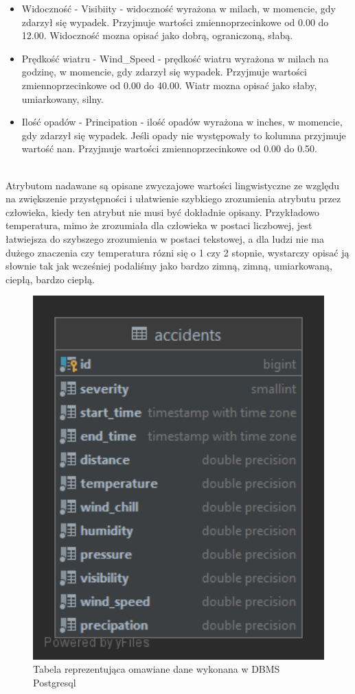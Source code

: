 \documentclass{classrep}
\begin{document}
\begin{itemize}
\item Widoczność - Visibiity - widoczność wyrażona w milach, w momencie, gdy zdarzył się wypadek. Przyjmuje wartości zmiennoprzecinkowe od 0.00 do 12.00. 
Widoczność mozna opisać jako dobrą, ograniczoną, słabą.
\item Prędkość wiatru - Wind\_Speed - prędkość wiatru wyrażona w milach na godzinę,  w momencie, gdy zdarzył się wypadek. Przyjmuje wartości zmiennoprzecinkowe od 0.00 do 40.00. Wiatr mozna opisać jako słaby, umiarkowany, silny.
\item Ilość opadów - Principation - ilość opadów wyrażona w inches, w momencie, gdy zdarzył się wypadek. Jeśli opady nie występowały to kolumna przyjmuje wartość nan.  Przyjmuje wartości zmiennoprzecinkowe od 0.00 do 0.50.
\end{itemize}
\ \\
Atrybutom nadawane są opisane zwyczajowe wartości lingwistyczne ze względu na zwiększenie przystępności i ułatwienie szybkiego zrozumienia atrybutu przez człowieka, kiedy ten atrybut nie musi być dokładnie opisany.
Przykładowo temperatura, mimo że zrozumiała dla człowieka w postaci liczbowej, jest łatwiejsza do szybszego zrozumienia w postaci tekstowej, a dla ludzi nie ma dużego znaczenia czy temperatura rózni się o 1 czy 2 stopnie, wystarczy opisać ją słownie tak jak wcześniej podaliśmy jako  bardzo zimną, zimną, umiarkowaną, ciepłą, bardzo ciepłą.


\begin{figure}[h!]
 \centering
 \includegraphics[width=14cm]{accidents.png}
 \vspace{-0.3cm}
 \caption{Tabela reprezentująca omawiane dane wykonana w DBMS Postgresql}
 \label{Wynik klasyfikacji.}
\end{figure}
\newpage
\end{document}
